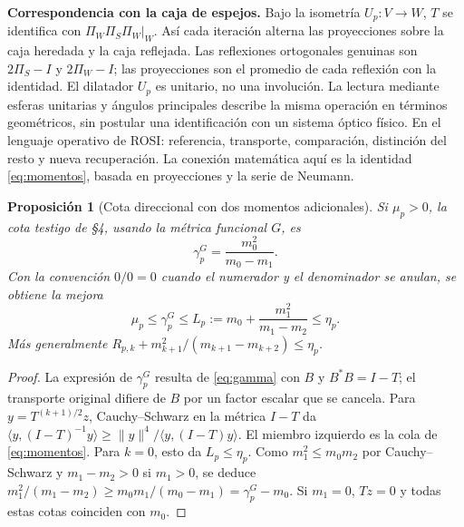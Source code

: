 \documentclass[11pt,a4paper]{article}
\theoremstyle{plain}
\newtheorem{proposicion}{Proposición}
\begin{document}
\textbf{Correspondencia con la caja de espejos.} Bajo la isometría $U_p:V\to W$, $T$ se identifica con $\Pi_W\Pi_S\Pi_W|_W$. Así cada iteración alterna las proyecciones sobre la caja heredada y la caja reflejada. Las reflexiones ortogonales genuinas son $2\Pi_S-I$ y $2\Pi_W-I$; las proyecciones son el promedio de cada reflexión con la identidad. El dilatador $U_p$ es unitario, no una involución. La lectura mediante esferas unitarias y ángulos principales describe la misma operación en términos geométricos, sin postular una identificación con un sistema óptico físico. En el lenguaje operativo de ROSI: referencia, transporte, comparación, distinción del resto y nueva recuperación. La conexión matemática aquí es la identidad \eqref{eq:momentos}, basada en proyecciones y la serie de Neumann.

\begin{proposicion}[Cota direccional con dos momentos adicionales]\label{prop:jensen}
Si $\mu_p>0$, la cota testigo de §4, usando la métrica funcional $G$, es
\[
 \gamma_p^{G}=\frac{m_0^2}{m_0-m_1}.
\]
Con la convención $0/0=0$ cuando el numerador y el denominador se anulan, se obtiene la mejora
\begin{equation}\label{eq:jensen}
 \mu_p\le\gamma_p^G\le L_p:=m_0+\frac{m_1^2}{m_1-m_2}\le\eta_p.
\end{equation}
Más generalmente $R_{p,k}+m_{k+1}^2/(m_{k+1}-m_{k+2})\le\eta_p$.
\end{proposicion}
\begin{proof}
La expresión de $\gamma_p^G$ resulta de \eqref{eq:gamma} con $B$ y $B^*B=I-T$; el transporte original difiere de $B$ por un factor escalar que se cancela. Para $y=T^{(k+1)/2}z$, Cauchy--Schwarz en la métrica $I-T$ da $\langle y,(I-T)^{-1}y\rangle\ge\|y\|^4/\langle y,(I-T)y\rangle$. El miembro izquierdo es la cola de \eqref{eq:momentos}. Para $k=0$, esto da $L_p\le\eta_p$. Como $m_1^2\le m_0m_2$ por Cauchy--Schwarz y $m_1-m_2>0$ si $m_1>0$, se deduce $m_1^2/(m_1-m_2)\ge m_0m_1/(m_0-m_1)=\gamma_p^G-m_0$. Si $m_1=0$, $Tz=0$ y todas estas cotas coinciden con $m_0$.
\end{proof}
\end{document}
